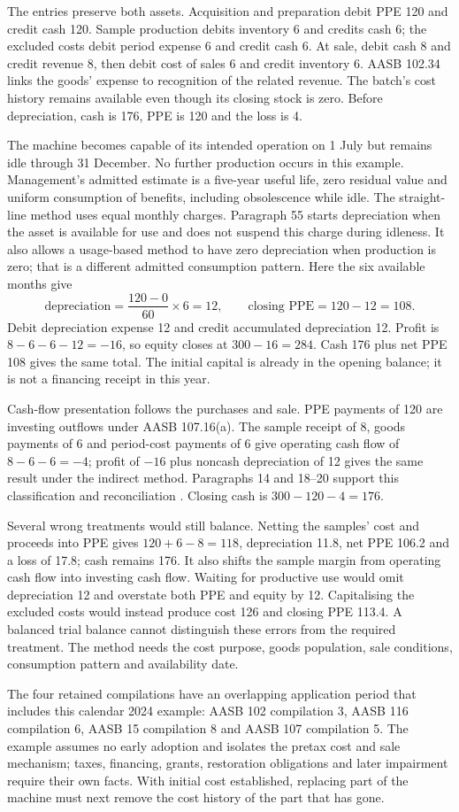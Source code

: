 The entries preserve both assets. Acquisition and preparation debit PPE 120
and credit cash 120. Sample production debits inventory 6 and credits cash 6;
the excluded costs debit period expense 6 and credit cash 6. At sale, debit
cash 8 and credit revenue 8, then debit cost of sales 6 and credit inventory 6.
AASB 102.34 links the goods' expense to recognition of the related revenue.
The batch's cost history remains available even though its closing stock is
zero. Before depreciation, cash is 176, PPE is 120 and the loss is 4.

The machine becomes capable of its intended operation on 1 July but remains
idle through 31 December. No further production occurs in this example.
Management's admitted estimate is a five-year useful life, zero residual
value and uniform consumption of benefits, including obsolescence while idle.
The straight-line method uses equal monthly charges. Paragraph 55 starts
depreciation when the asset is available for use and does not suspend this
charge during idleness. It also allows a usage-based method to have zero
depreciation when production is zero; that is a different admitted consumption
pattern. Here the six available months give
\[
  \text{depreciation}=\frac{120-0}{60}\times6=12,
  \qquad \text{closing PPE}=120-12=108.
\]
Debit depreciation expense 12 and credit accumulated depreciation 12. Profit
is \(8-6-6-12=-16\), so equity closes at \(300-16=284\).
Cash 176 plus net PPE 108 gives the same total. The initial capital is already
in the opening balance; it is not a financing receipt in this year.

Cash-flow presentation follows the purchases and sale. PPE payments of 120
are investing outflows under AASB 107.16(a). The sample receipt of 8, goods
payments of 6 and period-cost payments of 6 give operating cash flow of
\(8-6-6=-4\); profit of \(-16\) plus noncash depreciation of 12 gives the
same result under the indirect method. Paragraphs 14 and 18--20 support this
classification and reconciliation \citep{aasb107dated}. Closing cash is
\(300-120-4=176\).

Several wrong treatments would still balance. Netting the samples' cost and
proceeds into PPE gives \(120+6-8=118\), depreciation 11.8, net PPE 106.2
and a loss of 17.8; cash remains 176. It also shifts the sample margin from
operating cash flow into investing cash flow. Waiting for productive use
would omit depreciation 12 and overstate both PPE and equity by 12.
Capitalising the excluded costs would instead produce cost 126 and closing
PPE 113.4. A balanced trial balance cannot distinguish these errors from the
required treatment. The method needs the cost purpose, goods population,
sale conditions, consumption pattern and availability date.

The four retained compilations have an overlapping application period that
includes this calendar 2024 example: AASB 102 compilation 3, AASB 116
compilation 6, AASB 15 compilation 8 and AASB 107 compilation 5. The example
assumes no early adoption and isolates the pretax cost and sale mechanism;
taxes, financing, grants, restoration obligations and later impairment require
their own facts. With initial cost established, replacing part of the machine
must next remove the cost history of the part that has gone.

